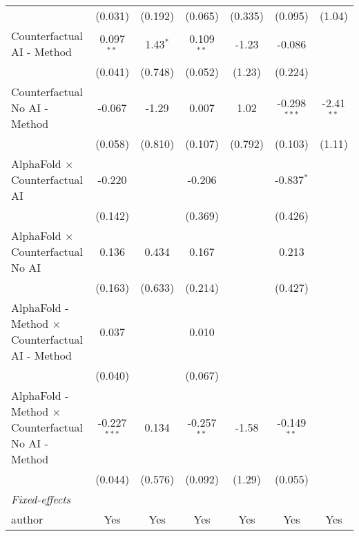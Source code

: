 \begin{tabular}{lcccccc}
                                                              & (0.031)        & (0.192)    & (0.065)       & (0.335)      & (0.095)        & (1.04)\\   
   Counterfactual AI - Method                                 & 0.097$^{**}$   & 1.43$^{*}$ & 0.109$^{**}$  & -1.23        & -0.086         &   \\   
                                                              & (0.041)        & (0.748)    & (0.052)       & (1.23)       & (0.224)        &   \\   
   Counterfactual No AI - Method                              & -0.067         & -1.29      & 0.007         & 1.02         & -0.298$^{***}$ & -2.41$^{**}$\\   
                                                              & (0.058)        & (0.810)    & (0.107)       & (0.792)      & (0.103)        & (1.11)\\   
   AlphaFold $\times$ Counterfactual AI                       & -0.220         &            & -0.206        &              & -0.837$^{*}$   &   \\   
                                                              & (0.142)        &            & (0.369)       &              & (0.426)        &   \\   
   AlphaFold $\times$ Counterfactual No AI                    & 0.136          & 0.434      & 0.167         &              & 0.213          &   \\   
                                                              & (0.163)        & (0.633)    & (0.214)       &              & (0.427)        &   \\   
   AlphaFold - Method $\times$ Counterfactual AI - Method     & 0.037          &            & 0.010         &              &                &   \\   
                                                              & (0.040)        &            & (0.067)       &              &                &   \\   
   AlphaFold - Method $\times$ Counterfactual No AI - Method  & -0.227$^{***}$ & 0.134      & -0.257$^{**}$ & -1.58        & -0.149$^{**}$  &   \\   
                                                              & (0.044)        & (0.576)    & (0.092)       & (1.29)       & (0.055)        &   \\   
   \midrule
   \emph{Fixed-effects}\\
   author                                                     & Yes            & Yes        & Yes           & Yes          & Yes            & Yes\\  

\end{tabular}
